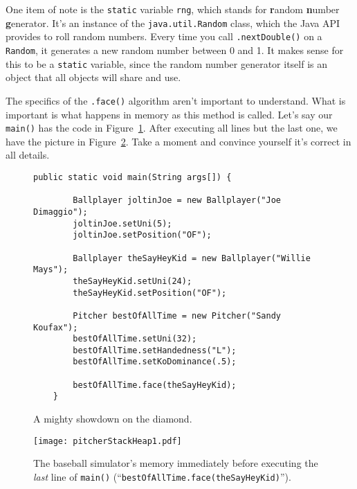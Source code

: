 \label{Random}
One item of note is the \texttt{static} variable \texttt{rng}, which stands
for \textbf{r}andom \textbf{n}umber \textbf{g}enerator. It's an instance of
the \texttt{java.util.Random} class, which the Java API provides to roll
random numbers. Every time you call \texttt{.nextDouble()} on a
\texttt{Random}, it generates a new random number between 0 and 1. It makes
sense for this to be a \texttt{static} variable, since the random number
generator itself is an object that all objects will share and use.

The specifics of the \texttt{.face()} algorithm aren't important to
understand. What is important is what happens in memory as this method is
called. Let's say our \texttt{main()} has the code in
Figure~\ref{fig:showdownCode}. After executing all lines but the last one, we
have the picture in Figure~\ref{fig:pitcherStackHeap1}. Take a moment and
convince yourself it's correct in all details.

\begin{figure}
\begin{Verbatim}[fontsize=\small,samepage=true,frame=single]
    public static void main(String args[]) {

        Ballplayer joltinJoe = new Ballplayer("Joe Dimaggio");
        joltinJoe.setUni(5);
        joltinJoe.setPosition("OF");

        Ballplayer theSayHeyKid = new Ballplayer("Willie Mays");
        theSayHeyKid.setUni(24);
        theSayHeyKid.setPosition("OF");

        Pitcher bestOfAllTime = new Pitcher("Sandy Koufax");
        bestOfAllTime.setUni(32);
        bestOfAllTime.setHandedness("L");
        bestOfAllTime.setKoDominance(.5);

        bestOfAllTime.face(theSayHeyKid);
    }
\end{Verbatim}
\caption{A mighty showdown on the diamond.}
\label{fig:showdownCode}
\end{figure}

\begin{figure}
\centering
\texttt{[image: pitcherStackHeap1.pdf]}  %
\caption{The baseball simulator's memory immediately before executing the
\textit{last} line of \texttt{main()} (``\texttt{bestOfAllTime.face(theSayHeyKid)}'').}
\label{fig:pitcherStackHeap1}
\end{figure}



